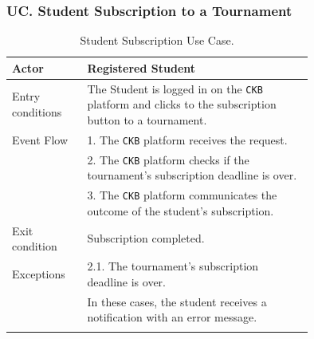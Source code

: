 \subsubsection*{UC\cuc . Student Subscription to a Tournament}
\begin{center}
    \begin{longtable}{lp{0.75\linewidth}}
        \hline
        Actor            & Registered Student                                                                                                                                                                               \\
        \hline
        Entry conditions & The Student is logged in on the \verb|CKB| platform and clicks to the subscription button to a tournament.                                                                                                            \\
        \hline
        Event Flow       
        & 1. The \verb|CKB| platform receives the request.\\
        & 2. The \verb|CKB| platform checks if the tournament's subscription deadline is over.\\
        & 3. The \verb|CKB| platform communicates the outcome of the student's subscription.\\
        \hline
        Exit condition   & Subscription completed.   \\                                                                                                                                                                           
        \hline
        Exceptions   
        & 2.1. The tournament's subscription deadline is over.\\                                                                                                                                              
            & In these cases, the student receives a notification with an error message.   \\                                                               
        \hline
        \caption{Student Subscription Use Case.}
        \label{tab: student_subscription_use_case}
    \end{longtable}


\end{center}
